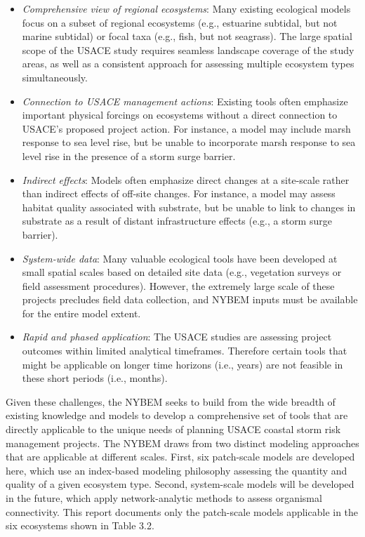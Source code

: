 \documentclass[
]{book}
\begin{document}
\begin{itemize}
\item
  \emph{Comprehensive view of regional ecosystems}: Many existing ecological models focus on a subset of regional ecosystems (e.g., estuarine subtidal, but not marine subtidal) or focal taxa (e.g., fish, but not seagrass). The large spatial scope of the USACE study requires seamless landscape coverage of the study areas, as well as a consistent approach for assessing multiple ecosystem types simultaneously.
\item
  \emph{Connection to USACE management actions}: Existing tools often emphasize important physical forcings on ecosystems without a direct connection to USACE's proposed project action. For instance, a model may include marsh response to sea level rise, but be unable to incorporate marsh response to sea level rise in the presence of a storm surge barrier.
\item
  \emph{Indirect effects}: Models often emphasize direct changes at a site-scale rather than indirect effects of off-site changes. For instance, a model may assess habitat quality associated with substrate, but be unable to link to changes in substrate as a result of distant infrastructure effects (e.g., a storm surge barrier).
\item
  \emph{System-wide data}: Many valuable ecological tools have been developed at small spatial scales based on detailed site data (e.g., vegetation surveys or field assessment procedures). However, the extremely large scale of these projects precludes field data collection, and NYBEM inputs must be available for the entire model extent.
\item
  \emph{Rapid and phased application}: The USACE studies are assessing project outcomes within limited analytical timeframes. Therefore certain tools that might be applicable on longer time horizons (i.e., years) are not feasible in these short periods (i.e., months).
\end{itemize}

Given these challenges, the NYBEM seeks to build from the wide breadth of existing knowledge and models to develop a comprehensive set of tools that are directly applicable to the unique needs of planning USACE coastal storm risk management projects. The NYBEM draws from two distinct modeling approaches that are applicable at different scales. First, six patch-scale models are developed here, which use an index-based modeling philosophy assessing the quantity and quality of a given ecosystem type. Second, system-scale models will be developed in the future, which apply network-analytic methods to assess organismal connectivity. This report documents only the patch-scale models applicable in the six ecosystems shown in Table 3.2.
\end{document}
